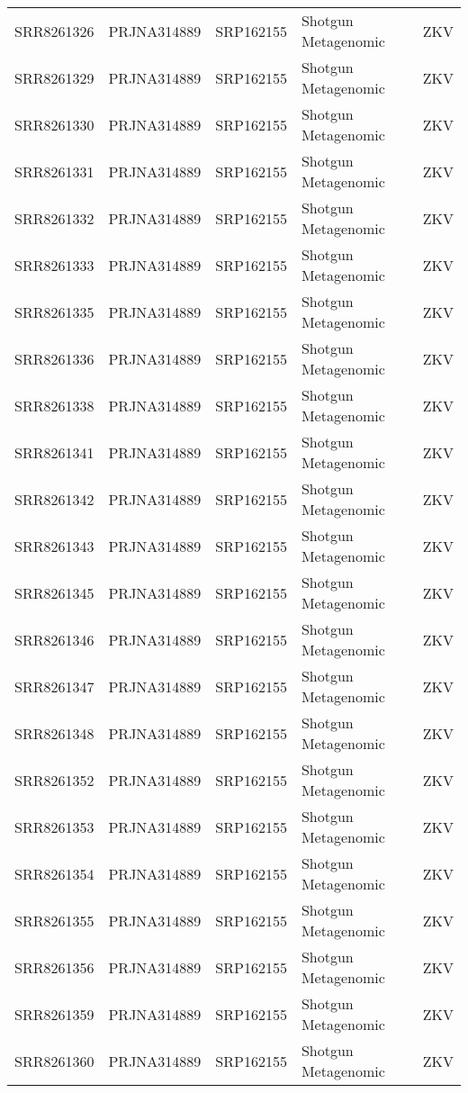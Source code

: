 \begin{scriptsize}
\begin{center}
\begin{longtable}{@{}lllll@{}}
SRR8261326 & PRJNA314889 & SRP162155 & Shotgun Metagenomic   & ZKV      \\
SRR8261329 & PRJNA314889 & SRP162155 & Shotgun Metagenomic   & ZKV      \\
SRR8261330 & PRJNA314889 & SRP162155 & Shotgun Metagenomic   & ZKV      \\
SRR8261331 & PRJNA314889 & SRP162155 & Shotgun Metagenomic   & ZKV      \\
SRR8261332 & PRJNA314889 & SRP162155 & Shotgun Metagenomic   & ZKV      \\
SRR8261333 & PRJNA314889 & SRP162155 & Shotgun Metagenomic   & ZKV      \\
SRR8261335 & PRJNA314889 & SRP162155 & Shotgun Metagenomic   & ZKV      \\
SRR8261336 & PRJNA314889 & SRP162155 & Shotgun Metagenomic   & ZKV      \\
SRR8261338 & PRJNA314889 & SRP162155 & Shotgun Metagenomic   & ZKV      \\
SRR8261341 & PRJNA314889 & SRP162155 & Shotgun Metagenomic   & ZKV      \\
SRR8261342 & PRJNA314889 & SRP162155 & Shotgun Metagenomic   & ZKV      \\
SRR8261343 & PRJNA314889 & SRP162155 & Shotgun Metagenomic   & ZKV      \\
SRR8261345 & PRJNA314889 & SRP162155 & Shotgun Metagenomic   & ZKV      \\
SRR8261346 & PRJNA314889 & SRP162155 & Shotgun Metagenomic   & ZKV      \\
SRR8261347 & PRJNA314889 & SRP162155 & Shotgun Metagenomic   & ZKV      \\
SRR8261348 & PRJNA314889 & SRP162155 & Shotgun Metagenomic   & ZKV      \\
SRR8261352 & PRJNA314889 & SRP162155 & Shotgun Metagenomic   & ZKV      \\
SRR8261353 & PRJNA314889 & SRP162155 & Shotgun Metagenomic   & ZKV      \\
SRR8261354 & PRJNA314889 & SRP162155 & Shotgun Metagenomic   & ZKV      \\
SRR8261355 & PRJNA314889 & SRP162155 & Shotgun Metagenomic   & ZKV      \\
SRR8261356 & PRJNA314889 & SRP162155 & Shotgun Metagenomic   & ZKV      \\
SRR8261359 & PRJNA314889 & SRP162155 & Shotgun Metagenomic   & ZKV      \\
SRR8261360 & PRJNA314889 & SRP162155 & Shotgun Metagenomic   & ZKV      \\

\end{longtable}
\end{center}
\end{scriptsize}
